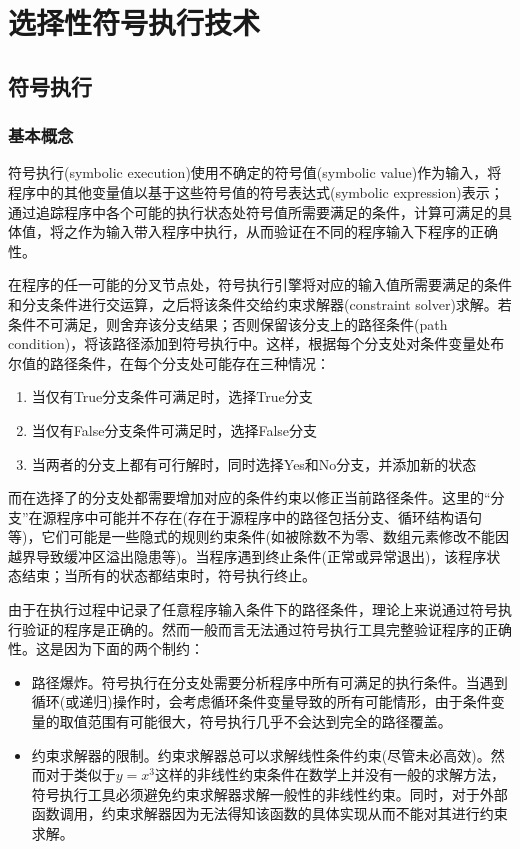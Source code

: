 \chapter{选择性符号执行技术}
\label{chap:overview}

\section{符号执行}
\label{sec:sym_exe}

\subsection{基本概念}
\label{sec:original}
符号执行(symbolic execution)使用不确定的符号值(symbolic value)作为输入，将程序中的其他变量值以基于这些符号值的符号表达式(symbolic expression)表示；通过追踪程序中各个可能的执行状态处符号值所需要满足的条件，计算可满足的具体值，将之作为输入带入程序中执行，从而验证在不同的程序输入下程序的正确性。

在程序的任一可能的分叉节点处，符号执行引擎将对应的输入值所需要满足的条件和分支条件进行交运算，之后将该条件交给约束求解器(constraint solver)求解。若条件不可满足，则舍弃该分支结果；否则保留该分支上的路径条件(path condition)，将该路径添加到符号执行中。这样，根据每个分支处对条件变量处布尔值的路径条件，在每个分支处可能存在三种情况：
\begin{enumerate}
\item 当仅有True分支条件可满足时，选择True分支
\item 当仅有False分支条件可满足时，选择False分支
\item 当两者的分支上都有可行解时，同时选择Yes和No分支，并添加新的状态
\end{enumerate}
而在选择了的分支处都需要增加对应的条件约束以修正当前路径条件。这里的“分支”在源程序中可能并不存在(存在于源程序中的路径包括分支、循环结构语句等)，它们可能是一些隐式的规则约束条件(如被除数不为零、数组元素修改不能因越界导致缓冲区溢出隐患等)。当程序遇到终止条件(正常或异常退出)，该程序状态结束；当所有的状态都结束时，符号执行终止。

由于在执行过程中记录了任意程序输入条件下的路径条件，理论上来说通过符号执行验证的程序是正确的。然而一般而言无法通过符号执行工具完整验证程序的正确性。这是因为下面的两个制约：
\begin{itemize}
\item 路径爆炸。符号执行在分支处需要分析程序中所有可满足的执行条件。当遇到循环(或递归)操作时，会考虑循环条件变量导致的所有可能情形，由于条件变量的取值范围有可能很大，符号执行几乎不会达到完全的路径覆盖。
\item 约束求解器的限制。约束求解器总可以求解线性条件约束(尽管未必高效)。然而对于类似于$y=x^3$这样的非线性约束条件在数学上并没有一般的求解方法，符号执行工具必须避免约束求解器求解一般性的非线性约束。同时，对于外部函数调用，约束求解器因为无法得知该函数的具体实现从而不能对其进行约束求解。
\end{itemize}

